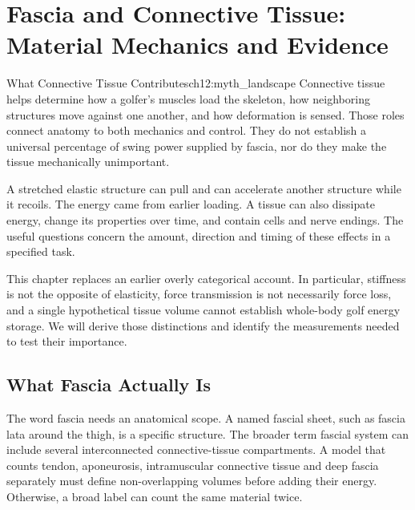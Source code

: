 \chapter[Fascia and Connective Tissue]{Fascia and Connective Tissue:\\Material Mechanics and Evidence}
\label{ch:fascia}
\raggedbottom
{}

\begin{laymansbox}{What Connective Tissue Contributes}{ch12:myth_landscape}
Connective tissue helps determine how a golfer's muscles load the skeleton, how neighboring structures move against one another, and how deformation is sensed. Those roles connect anatomy to both mechanics and control. They do not establish a universal percentage of swing power supplied by fascia, nor do they make the tissue mechanically unimportant.

A stretched elastic structure can pull and can accelerate another structure while it recoils. The energy came from earlier loading. A tissue can also dissipate energy, change its properties over time, and contain cells and nerve endings. The useful questions concern the amount, direction and timing of these effects in a specified task.

This chapter replaces an earlier overly categorical account. In particular, stiffness is not the opposite of elasticity, force transmission is not necessarily force loss, and a single hypothetical tissue volume cannot establish whole-body golf energy storage. We will derive those distinctions and identify the measurements needed to test their importance.
\end{laymansbox}

\section{What Fascia Actually Is}

The word fascia needs an anatomical scope. A named fascial sheet, such as fascia lata around the thigh, is a specific structure. The broader term fascial system can include several interconnected connective-tissue compartments. A model that counts tendon, aponeurosis, intramuscular connective tissue and deep fascia separately must define non-overlapping volumes before adding their energy. Otherwise, a broad label can count the same material twice.

